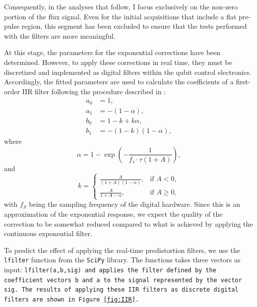 Consequently, in the analyses that follow, I focus exclusively on the non-zero portion of the flux signal. 
Even for the initial acquisitions that include a flat pre-pulse region, this segment has been excluded to ensure that the tests performed with the filters are more meaningful.

At this stage, the parameters for the exponential corrections have been determined. However, to apply these corrections in real time, they must be discretized and implemented as digital filters within the qubit control electronics. 
Accordingly, the fitted parameters are used to calculate the coefficients of a first-order IIR filter following the procedure described in \cite{rol_time-domain_2020}:
\begin{align}
    a_0 &= 1, \\
    a_1 &= -(1 - \alpha), \\
    b_0 &= 1 - k + k \alpha, \\
    b_1 &= -(1 - k)(1 - \alpha),
\end{align}
where 
\begin{equation}
\alpha = 1 - \exp\left(-\frac{1}{f_s \cdot \tau (1 + A)}\right),
\end{equation}
and
\begin{equation}
    k =
    \begin{cases}
    \frac{A}{(1 + A)(1 - \alpha)}, & \text{if } A < 0, \\
    \frac{A}{1 + A - \alpha}, & \text{if } A \geq 0,
    \end{cases}
\end{equation}
with $f_S$ being the sampling frequency of the digital hardware.
Since this is an approximation of the exponential response, we expect the quality of the correction to be somewhat reduced compared to what is achieved by applying the continuous exponential filter.

To predict the effect of applying the real-time predistortion filters, we use the \texttt{lfilter} function from the \texttt{SciPy} library. 
The functions takes three vectors as input: \tt{lfilter(a,b,sig)} and applies the filter defined by the coefficient vectors \texttt{b} and \texttt{a} to the signal represented by the vector \texttt{sig}. 
The results of applying these IIR filters as discrete digital filters are shown in Figure \ref{fig:IIR}.

